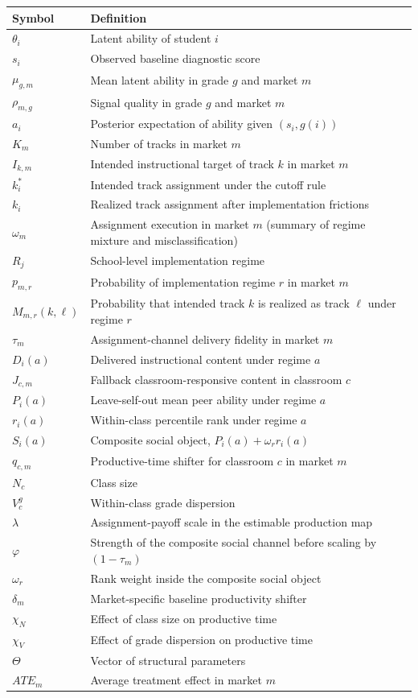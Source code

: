 \documentclass[11pt]{article}
\begin{document}
\begin{longtable}{p{2.5cm}p{11cm}}
\toprule
Symbol & Definition \\
\midrule
$\theta_i$ & Latent ability of student $i$ \\
$s_i$ & Observed baseline diagnostic score \\
$\mu_{g,m}$ & Mean latent ability in grade $g$ and market $m$ \\
$\rho_{m,g}$ & Signal quality in grade $g$ and market $m$ \\
$a_i$ & Posterior expectation of ability given $(s_i,g(i))$ \\
$K_m$ & Number of tracks in market $m$ \\
$I_{k,m}$ & Intended instructional target of track $k$ in market $m$ \\
$k_i^*$ & Intended track assignment under the cutoff rule \\
$k_i$ & Realized track assignment after implementation frictions \\
$\omega_m$ & Assignment execution in market $m$ (summary of regime mixture and misclassification) \\
$R_j$ & School-level implementation regime \\
$p_{m,r}$ & Probability of implementation regime $r$ in market $m$ \\
$M_{m,r}(k,\ell)$ & Probability that intended track $k$ is realized as track $\ell$ under regime $r$ \\
$\tau_m$ & Assignment-channel delivery fidelity in market $m$ \\
$D_i(a)$ & Delivered instructional content under regime $a$ \\
$J_{c,m}$ & Fallback classroom-responsive content in classroom $c$ \\
$P_i(a)$ & Leave-self-out mean peer ability under regime $a$ \\
$r_i(a)$ & Within-class percentile rank under regime $a$ \\
$S_i(a)$ & Composite social object, $P_i(a)+\omega_r r_i(a)$ \\
$q_{c,m}$ & Productive-time shifter for classroom $c$ in market $m$ \\
$N_c$ & Class size \\
$V_c^g$ & Within-class grade dispersion \\
$\lambda$ & Assignment-payoff scale in the estimable production map \\
$\varphi$ & Strength of the composite social channel before scaling by $(1-\tau_m)$ \\
$\omega_r$ & Rank weight inside the composite social object \\
$\delta_m$ & Market-specific baseline productivity shifter \\
$\chi_N$ & Effect of class size on productive time \\
$\chi_V$ & Effect of grade dispersion on productive time \\
$\Theta$ & Vector of structural parameters \\
$ATE_m$ & Average treatment effect in market $m$ \\
\bottomrule
\end{longtable}
\end{document}
